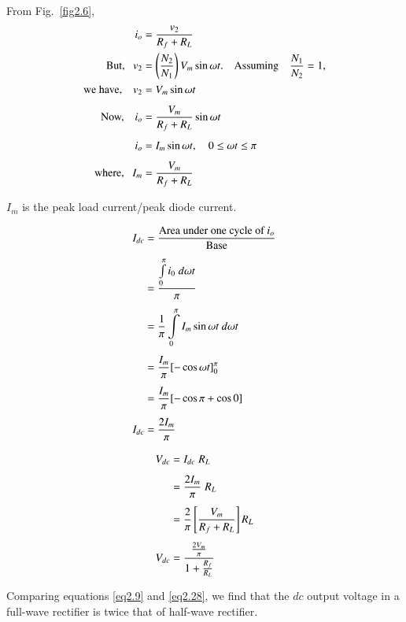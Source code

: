 From Fig.~\ref{fig2.6},
\begin{align}
i_o & = \frac{v_2}{R_f + R_L} \notag\\
\text{But, } ~ ~v_2 & = \left(\frac{N_2}{N_1} \right) V_m \sin \omega
t. \quad \text{Assuming }~~~ \frac{N_1}{N_2} = 1, \notag\\
\text{we have, } ~~~ v_2 & = V_m \sin \omega t \notag\\[4pt]
\text{Now, } ~~~ i_o & = \frac{V_m}{R_f + R_L} \sin \omega
t  \label{eq2.25}\\[4pt]
i_o & = I_m \sin \omega t, \quad 0 \leq \omega t \leq \pi \notag\\[4pt]
\text{ where, ~~} I_m & = \frac{V_m}{R_f + R_L} \label{eq2.26}
\end{align}

$I_m$ is the peak load current/peak diode current.

\smallskip

\begin{align}
I_{dc} & = \frac{\text{Area under one cycle of $i_o$}}{\text{Base}} \notag\\[4pt]
& = \frac{\int\limits^\pi_0 i_0\; d \omega t}{\pi} \notag\\[4pt]
& = \frac{1}{\pi} \int\limits^{\pi}_0 I_m \sin \omega t~ d \omega t \notag\\[4pt]
& = \frac{I_m}{\pi} [-\cos \omega t]^\pi_0 \notag\\[4pt]
& = \frac{I_m}{\pi} [-\cos \pi + \cos 0]\notag\\[4pt]
I_{dc} & = \frac{2 I_m}{\pi} \label{eq2.27}
\end{align}

\begin{align}
V_{dc} & = I_{dc}\; R_L \notag\\[4pt]
& = \frac{2I_m}{\pi}\;{R_L}\notag\\[4pt]
& = \frac{2}{\pi} \left[\frac{V_m}{R_f+ R_L} \right] R_L \notag\\[4pt]
V_{dc} & = \frac{\frac{2V_m}{\pi}}{1+ \frac{R_f}{R_L}} \label{eq2.28}
\end{align}

Comparing equations \eqref{eq2.9} and \eqref{eq2.28}, we find  that the $dc$ output
voltage in a full-wave rectifier is twice that of half-wave rectifier.

\vfill\eject

